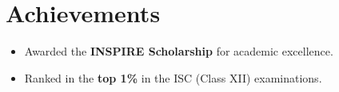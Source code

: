 \documentclass[11pt,a4paper]{article}
\begin{document}
\section*{Achievements}
 
\begin{itemize}
\item Awarded the \textbf{INSPIRE Scholarship} for academic excellence.
\item Ranked in the \textbf{top 1\%} in the ISC (Class XII) examinations.
\end{itemize}
 
\end{document}
